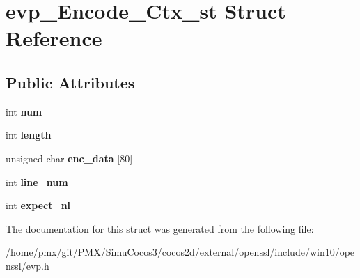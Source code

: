 \hypertarget{structevp__Encode__Ctx__st}{}\section{evp\+\_\+\+Encode\+\_\+\+Ctx\+\_\+st Struct Reference}
\label{structevp__Encode__Ctx__st}
\subsection*{Public Attributes}
\begin{DoxyCompactItemize}
\item 
\mbox{\label{structevp__Encode__Ctx__st_a7a68545e6131f26113bc316cb66e794d}} 
int {\bfseries num}
\item 
\mbox{\label{structevp__Encode__Ctx__st_ab5409ce49d7af9d0320f5bd1c9bbdfd4}} 
int {\bfseries length}
\item 
\mbox{\label{structevp__Encode__Ctx__st_ab2465a57d3ee1c0d7efba8f278c81911}} 
unsigned char {\bfseries enc\+\_\+data} \mbox{[}80\mbox{]}
\item 
\mbox{\label{structevp__Encode__Ctx__st_a92d2880fa44acb614cff2005fe3d74e3}} 
int {\bfseries line\+\_\+num}
\item 
\mbox{\label{structevp__Encode__Ctx__st_ae152066ba261286f7521992aefbfa952}} 
int {\bfseries expect\+\_\+nl}
\end{DoxyCompactItemize}


The documentation for this struct was generated from the following file\+:\begin{DoxyCompactItemize}
\item 
/home/pmx/git/\+P\+M\+X/\+Simu\+Cocos3/cocos2d/external/openssl/include/win10/openssl/evp.\+h\end{DoxyCompactItemize}
